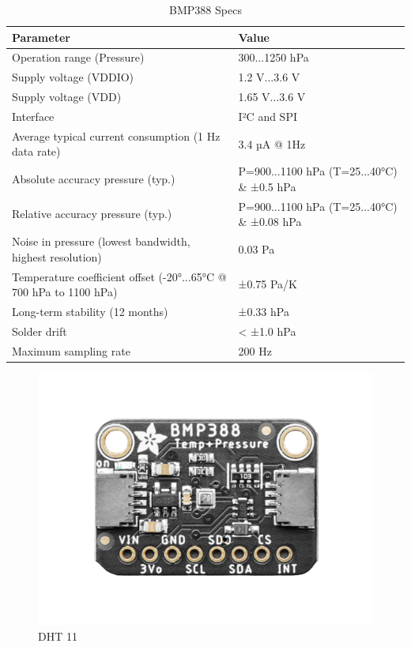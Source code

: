 \begin{table}[H]
    \centering
    \begin{tabular}{|p{8cm}|p{6cm}|}
        \hline
        \textbf{Parameter} & \textbf{Value} \\ \hline
        Operation range (Pressure) & 300...1250 hPa \\ \hline
        Supply voltage (VDDIO) & 1.2 V...3.6 V \\ \hline
        Supply voltage (VDD) & 1.65 V...3.6 V \\ \hline
        Interface & I²C and SPI \\ \hline
        Average typical current consumption (1 Hz data rate) & 3.4 µA @ 1Hz \\ \hline
        Absolute accuracy pressure (typ.) & P=900...1100 hPa (T=25...40°C) \& ±0.5 hPa \\ \hline
        Relative accuracy pressure (typ.) & P=900...1100 hPa (T=25...40°C) \& ±0.08 hPa \\ \hline
        Noise in pressure (lowest bandwidth, highest resolution) & 0.03 Pa \\ \hline
        Temperature coefficient offset (-20°...65°C @ 700 hPa to 1100 hPa) & ±0.75 Pa/K \\ \hline
        Long-term stability (12 months) & ±0.33 hPa \\ \hline
        Solder drift & < ±1.0 hPa \\ \hline
        Maximum sampling rate & 200 Hz \\ \hline
    \end{tabular}
    \caption{BMP388 Specs}
\end{table}
\begin{figure}[H]
    \centering
    \includegraphics[width=.4\textwidth]{images/node/bmp388.png}
    \caption{DHT 11}
\end{figure}

